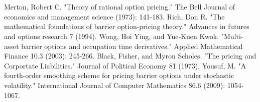 \documentclass[11pt]{article}
\begin{document}
\newpage
\section*{} \label{bibsection}


\begin{thebibliography}{MMMMM} 
 Merton, Robert C. "Theory of rational option pricing." The Bell Journal of economics and management science (1973): 141-183.
 Rich, Don R. "The mathematical foundations of barrier option-pricing theory." Advances in futures and options research 7 (1994).
 Wong, Hoi Ying, and Yue‐Kuen Kwok. "Multi-asset barrier options and occupation time derivatives." Applied Mathematical Finance 10.3 (2003): 245-266.
Black, Fisher, and Myron Scholes. "The pricing and Corportate Liabilities." Journal of Political Economy 81 (1973).
 Yousuf, M. "A fourth-order smoothing scheme for pricing barrier options under stochastic volatility." International Journal of Computer Mathematics 86.6 (2009): 1054-1067.

\end{thebibliography}


\end{document}
